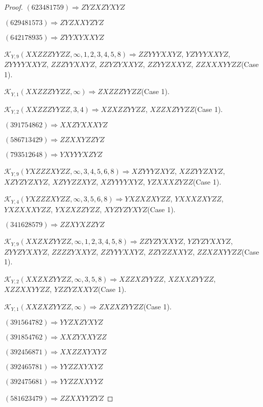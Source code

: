 \documentclass[12pt]{article}
\theoremstyle{plain}
\theoremstyle{definition}
\theoremstyle{remark}
\newcommand{\fancy}[1]{\mathcal{#1}}
\def\K{\fancy{K}}
\begin{document}
\begin{proof}
	$(6 2 3 4 8 1 7 5 9)\Rightarrow ZYZXZYXYZ$
	
	$(6 2 9 4 8 1 5 7 3)\Rightarrow ZYZXXYZYZ$
	
	$(6 4 2 1 7 8 9 3 5)\Rightarrow ZYYXYXXYZ$
	
	
	
	$\K_{Y,9}(XXZZZYYZZ,\infty,1, 2, 3, 4, 5, 8)\Rightarrow $$ZZYYYXXYZ$, $YZYYYXXYZ$, $ZYYYYXXYZ$, $ZZZYYXXYZ$, $ZZYZYXXYZ$, $ZZYYZXXYZ$, $ZZXXXYYZZ$(Case 1).
	
	$\K_{Y,1}(XXZZZYYZZ,\infty)\Rightarrow $$ZXZZZYYZZ$(Case 1).
	
	$\K_{Y,2}(XXZZZYYZZ,3, 4)\Rightarrow $$XZXZZYYZZ$, $XZZXZYYZZ$(Case 1).
	
	
	
	$(3 9 1 7 5 4 8 6 2)\Rightarrow XXZYXXXYZ$
	
	$(5 8 6 7 1 3 4 2 9)\Rightarrow ZZXXYZZYZ$
	
	$(7 9 3 5 1 2 6 4 8)\Rightarrow YXYYYXZYZ$
	
	
	
	$\K_{Y,9}(YXZZZXYZZ,\infty,3, 4, 5, 6, 8)\Rightarrow $$XZYYYZXYZ$, $XZZYYZXYZ$, $XZYZYZXYZ$, $XZYYZZXYZ$, $XZYYYYXYZ$, $YZXXXZYZZ$(Case 1).
	
	$\K_{Y,4}(YXZZZXYZZ,\infty,3, 5, 6, 8)\Rightarrow $$YXZXZXYZZ$, $YXXXZXYZZ$, $YXZXXXYZZ$, $YXZXZZYZZ$, $XYZYZYXYZ$(Case 1).
	
	
	
	$(3 4 1 6 2 8 5 7 9)\Rightarrow ZZXYXZZYZ$
	
	
	
	$\K_{Y,9}(XXZXZYYZZ,\infty,1, 2, 3, 4, 5, 8)\Rightarrow $$ZZYZYXXYZ$, $YZYZYXXYZ$, $ZYYZYXXYZ$, $ZZZZYXXYZ$, $ZZYYYXXYZ$, $ZZYZZXXYZ$, $ZZXZXYYZZ$(Case 1).
	
	$\K_{Y,2}(XXZXZYYZZ,\infty,3, 5, 8)\Rightarrow $$XZZXZYYZZ$, $XZXXZYYZZ$, $XZZXXYYZZ$, $YZZYZXXYZ$(Case 1).
	
	$\K_{Y,1}(XXZXZYYZZ,\infty)\Rightarrow $$ZXZXZYYZZ$(Case 1).
	
	
	
	$(3 9 1 5 6 4 7 8 2)\Rightarrow YYZXZYXYZ$
	
	$(3 9 1 8 5 4 7 6 2)\Rightarrow XXZYXXYZZ$
	
	$(3 9 2 4 5 6 8 7 1)\Rightarrow XXZZXYXYZ$
	
	$(3 9 2 4 6 5 7 8 1)\Rightarrow YYZZXYXYZ$
	
	$(3 9 2 4 7 5 6 8 1)\Rightarrow YYZZXXYYZ$
	
	$(5 8 1 6 2 3 4 7 9)\Rightarrow ZZXXYYZYZ$
	

\end{proof}
\end{document}
